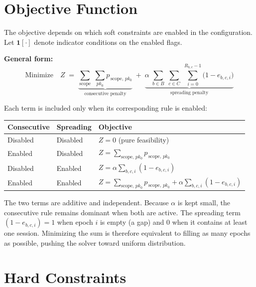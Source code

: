 \documentclass{article}
\begin{document}
\section{Objective Function}
The objective depends on which soft constraints are enabled in the configuration. Let $\mathbf{1}[\cdot]$ denote indicator conditions on the enabled flags.

\bigskip
\noindent\textbf{General form:}
\begin{equation}
    \text{Minimize} \quad Z \;=\; \underbrace{\sum_{\mathrm{scope}}\;\sum_{pk_0} p_{\,\mathrm{scope},\,pk_0}}_{\text{consecutive penalty}} \;+\; \underbrace{\alpha \;\sum_{b \in B}\;\sum_{c \in C}\;\sum_{i=0}^{R_{b,c}-1} \bigl(1 - e_{b,c,i}\bigr)}_{\text{spreading penalty}}
\end{equation}

\noindent Each term is included only when its corresponding rule is enabled:

\bigskip
\begin{center}
\begin{tabular}{lll}
\hline
Consecutive & Spreading & Objective \\
\hline
Disabled & Disabled & $Z = 0$ \quad (pure feasibility) \\
Enabled  & Disabled & $Z = \displaystyle\sum_{\mathrm{scope},\,pk_0} p_{\,\mathrm{scope},\,pk_0}$ \\
Disabled & Enabled  & $Z = \alpha\displaystyle\sum_{b,c,i}(1 - e_{b,c,i})$ \\
Enabled  & Enabled  & $Z = \displaystyle\sum_{\mathrm{scope},\,pk_0} p_{\,\mathrm{scope},\,pk_0} + \alpha\displaystyle\sum_{b,c,i}(1 - e_{b,c,i})$ \\
\hline
\end{tabular}
\end{center}

\bigskip
\noindent The two terms are additive and independent. Because $\alpha$ is kept small, the consecutive rule remains dominant when both are active. The spreading term $(1 - e_{b,c,i}) = 1$ when epoch $i$ is empty (a gap) and $0$ when it contains at least one session. Minimizing the sum is therefore equivalent to filling as many epochs as possible, pushing the solver toward uniform distribution.

\section{Hard Constraints}
\end{document}
